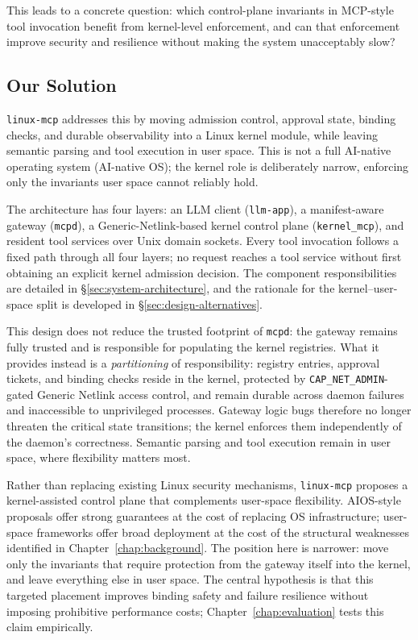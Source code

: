 This leads to a concrete question: which control-plane invariants in MCP-style tool invocation benefit from kernel-level enforcement, and can that enforcement improve security and resilience without making the system unacceptably slow?

\subsection{Our Solution}

\texttt{linux-mcp} addresses this by moving admission control, approval state, binding checks, and durable observability into a Linux kernel module, while leaving semantic parsing and tool execution in user space.
This is not a full AI-native operating system (AI-native OS); the kernel role is deliberately narrow, enforcing only the invariants user space cannot reliably hold.

The architecture has four layers: an LLM client (\texttt{llm-app}), a manifest-aware gateway (\texttt{mcpd}), a Generic-Netlink-based kernel control plane (\texttt{kernel\_mcp}), and resident tool services over Unix domain sockets.
Every tool invocation follows a fixed path through all four layers; no request reaches a tool service without first obtaining an explicit kernel admission decision.
The component responsibilities are detailed in \S\ref{sec:system-architecture}, and the rationale for the kernel--user-space split is developed in \S\ref{sec:design-alternatives}.

This design does not reduce the trusted footprint of \texttt{mcpd}: the gateway remains fully trusted and is responsible for populating the kernel registries.
What it provides instead is a \emph{partitioning} of responsibility: registry entries, approval tickets, and binding checks reside in the kernel, protected by \texttt{CAP\_NET\_ADMIN}-gated Generic Netlink access control, and remain durable across daemon failures and inaccessible to unprivileged processes.
Gateway logic bugs therefore no longer threaten the critical state transitions; the kernel enforces them independently of the daemon's correctness.
Semantic parsing and tool execution remain in user space, where flexibility matters most.

Rather than replacing existing Linux security mechanisms, \texttt{linux-mcp} proposes a kernel-assisted control plane that complements user-space flexibility.
AIOS-style proposals offer strong guarantees at the cost of replacing OS infrastructure; user-space frameworks offer broad deployment at the cost of the structural weaknesses identified in Chapter~\ref{chap:background}.
The position here is narrower: move only the invariants that require protection from the gateway itself into the kernel, and leave everything else in user space.
The central hypothesis is that this targeted placement improves binding safety and failure resilience without imposing prohibitive performance costs; Chapter~\ref{chap:evaluation} tests this claim empirically.

